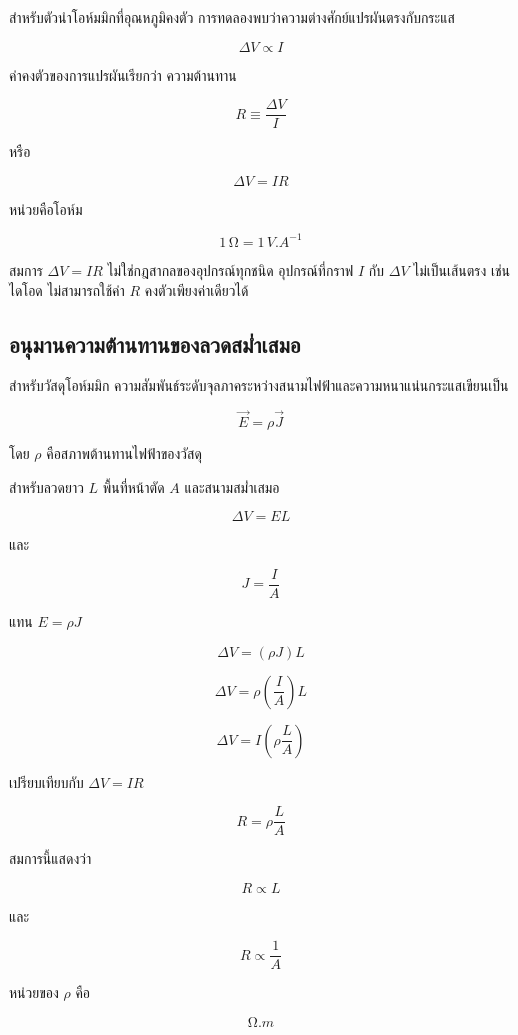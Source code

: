 สำหรับตัวนำโอห์มมิกที่อุณหภูมิคงตัว การทดลองพบว่าความต่างศักย์แปรผันตรงกับกระแส

\[
\Delta V\propto I
\]

ค่าคงตัวของการแปรผันเรียกว่า ความต้านทาน

\begin{tcolorbox}[title={นิยามความต้านทานของอุปกรณ์โอห์มมิก}]
\[
\boxed{R\equiv\frac{\Delta V}{I}}
\]

หรือ

\[
\boxed{\Delta V=IR}
\]

หน่วยคือโอห์ม

\[
1\,\si{\ohm}=1\,\si{V.A^{-1}}
\]
\end{tcolorbox}

สมการ $\Delta V=IR$ ไม่ใช่กฎสากลของอุปกรณ์ทุกชนิด อุปกรณ์ที่กราฟ $I$ กับ $\Delta V$ ไม่เป็นเส้นตรง เช่น ไดโอด ไม่สามารถใช้ค่า $R$ คงตัวเพียงค่าเดียวได้

\subsection{อนุมานความต้านทานของลวดสม่ำเสมอ}

สำหรับวัสดุโอห์มมิก ความสัมพันธ์ระดับจุลภาคระหว่างสนามไฟฟ้าและความหนาแน่นกระแสเขียนเป็น

\[
\vec{E}=\rho\vec{J}
\]

โดย $\rho$ คือสภาพต้านทานไฟฟ้าของวัสดุ

สำหรับลวดยาว $L$ พื้นที่หน้าตัด $A$ และสนามสม่ำเสมอ

\[
\Delta V=EL
\]

และ

\[
J=\frac{I}{A}
\]

แทน $E=\rho J$

\[
\Delta V=(\rho J)L
\]

\[
\Delta V=\rho\left(\frac{I}{A}\right)L
\]

\[
\Delta V=I\left(\rho\frac{L}{A}\right)
\]

เปรียบเทียบกับ $\Delta V=IR$

\begin{tcolorbox}[title={ความต้านทานของลวดสม่ำเสมอ}]
\[
\boxed{R=\rho\frac{L}{A}}
\]
\end{tcolorbox}

สมการนี้แสดงว่า

\[
R\propto L
\]

และ

\[
R\propto\frac{1}{A}
\]

หน่วยของ $\rho$ คือ

\[
\si{\ohm.m}
\]

